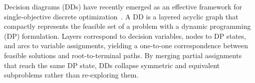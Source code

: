 \documentclass[letterpaper]{article}
\begin{document}
Decision diagrams (DDs) have recently emerged as an effective framework for single-objective discrete optimization~\citep{bergman2016decision}. A DD is a layered acyclic graph that compactly represents the feasible set of a problem with a dynamic programming (DP) formulation. Layers correspond to decision variables, nodes to DP states, and arcs to variable assignments, yielding a one-to-one correspondence between feasible solutions and root-to-terminal paths. By merging partial assignments that reach the same DP state, DDs collapse symmetric and equivalent subproblems rather than re-exploring them.

\end{document}
